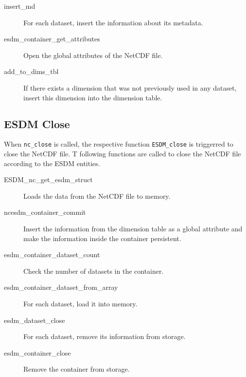 \begin{description}
\item[insert\_md]

For each dataset, insert the information about its metadata.

\item[esdm\_container\_get\_attributes]

Open the global attributes of the NetCDF file.

\item[add\_to\_dims\_tbl]

If there exists a dimension that was not previously used in any dataset, insert this dimension into the dimension table.

\end{description}

\subsection{ESDM Close}

When \texttt{nc\_close} is called, the respective function \texttt{ESDM\_close} is triggerred to close the NetCDF file.
T following functions are called to close the NetCDF file according to the ESDM entities.

\begin{description}

\item[ESDM\_nc\_get\_esdm\_struct]

Loads the data from the NetCDF file to memory.

\item[ncesdm\_container\_commit]

Insert the information from the dimension table as a global attribute and make the information inside the container persistent.

\item[esdm\_container\_dataset\_count]

Check the number of datasets in the container.

\item[esdm\_container\_dataset\_from\_array]

For each dataset, load it into memory.

\item[esdm\_dataset\_close]

For each dataset, remove its information from storage.

\item[esdm\_container\_close]

Remove the container from storage.

\end{description}

